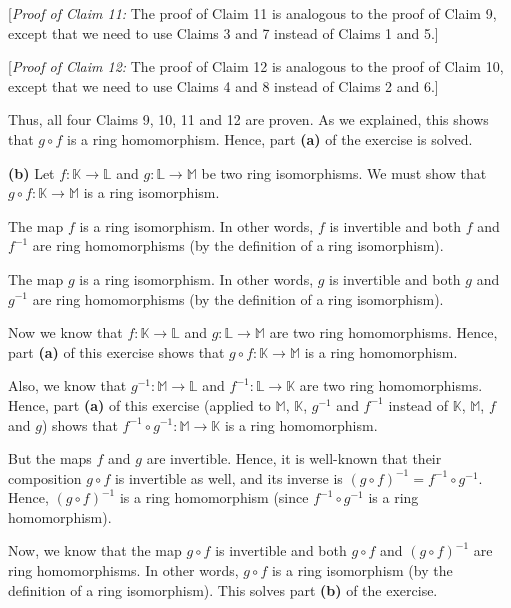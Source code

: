 \documentclass[paper=a4, fontsize=12pt]{scrartcl}%
\theoremstyle{plainsl}
\theoremstyle{definition}
\theoremstyle{remark}
\begin{document}
[\textit{Proof of Claim 11:} The proof of Claim 11 is analogous to the proof
of Claim 9, except that we need to use Claims 3 and 7 instead of Claims 1 and 5.]

[\textit{Proof of Claim 12:} The proof of Claim 12 is analogous to the proof
of Claim 10, except that we need to use Claims 4 and 8 instead of Claims 2 and 6.]

Thus, all four Claims 9, 10, 11 and 12 are proven. As we explained, this shows
that $g\circ f$ is a ring homomorphism. Hence, part \textbf{(a)} of the
exercise is solved.

\bigskip

\textbf{(b)} Let $f:\mathbb{K}\rightarrow\mathbb{L}$ and $g:\mathbb{L}%
\rightarrow\mathbb{M}$ be two ring isomorphisms. We must show that $g\circ
f:\mathbb{K}\rightarrow\mathbb{M}$ is a ring isomorphism.

The map $f$ is a ring isomorphism. In other words, $f$ is invertible and both
$f$ and $f^{-1}$ are ring homomorphisms (by the definition of a ring isomorphism).

The map $g$ is a ring isomorphism. In other words, $g$ is invertible and both
$g$ and $g^{-1}$ are ring homomorphisms (by the definition of a ring isomorphism).

Now we know that $f:\mathbb{K}\rightarrow\mathbb{L}$ and $g:\mathbb{L}%
\rightarrow\mathbb{M}$ are two ring homomorphisms. Hence, part \textbf{(a)} of
this exercise shows that $g\circ f:\mathbb{K}\rightarrow\mathbb{M}$ is a ring homomorphism.

Also, we know that $g^{-1}:\mathbb{M}\rightarrow\mathbb{L}$ and $f^{-1}%
:\mathbb{L}\rightarrow\mathbb{K}$ are two ring homomorphisms. Hence, part
\textbf{(a)} of this exercise (applied to $\mathbb{M}$, $\mathbb{K}$, $g^{-1}$
and $f^{-1}$ instead of $\mathbb{K}$, $\mathbb{M}$, $f$ and $g$) shows that
$f^{-1}\circ g^{-1}:\mathbb{M}\rightarrow\mathbb{K}$ is a ring homomorphism.

But the maps $f$ and $g$ are invertible. Hence, it is well-known that their
composition $g\circ f$ is invertible as well, and its inverse is $\left(
g\circ f\right)  ^{-1}=f^{-1}\circ g^{-1}$. Hence, $\left(  g\circ f\right)
^{-1}$ is a ring homomorphism (since $f^{-1}\circ g^{-1}$ is a ring homomorphism).

Now, we know that the map $g\circ f$ is invertible and both $g\circ f$ and
$\left(  g\circ f\right)  ^{-1}$ are ring homomorphisms. In other words,
$g\circ f$ is a ring isomorphism (by the definition of a ring isomorphism).
This solves part \textbf{(b)} of the exercise.
\end{document}

